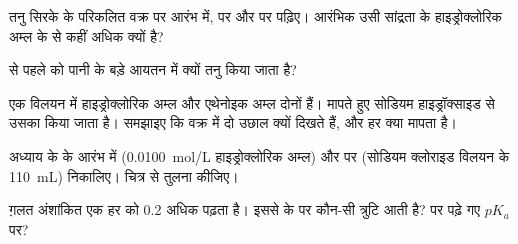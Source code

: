 \begin{exercise}[$\star\star$]\label{exo:g12:ph-conductivity-titrations:10}
तनु सिरके के परिकलित वक्र पर आरंभ में,
 पर और  पर  पढ़िए। आरंभिक  उसी सांद्रता के
हाइड्रोक्लोरिक अम्ल के  से कहीं अधिक क्यों है?
\end{exercise}

\begin{exercise}[$\star\star$]\label{exo:g12:ph-conductivity-titrations:11}
 से पहले  को पानी के बड़े आयतन में
क्यों तनु किया जाता है?
\end{exercise}

\begin{exercise}[$\star\star\star$]\label{exo:g12:ph-conductivity-titrations:12}
एक विलयन में हाइड्रोक्लोरिक अम्ल और एथेनोइक अम्ल दोनों हैं।  मापते हुए
सोडियम हाइड्रॉक्साइड से उसका  किया जाता है। समझाइए कि
वक्र में दो उछाल क्यों दिखते हैं, और हर  क्या मापता है।
\end{exercise}

\begin{exercise}[$\star\star\star$]\label{exo:g12:ph-conductivity-titrations:13}
अध्याय के  के आरंभ में (\qty{0.0100}{mol/L} हाइड्रोक्लोरिक अम्ल)
और  पर (सोडियम क्लोराइड विलयन के \qty{110}{mL}) 
निकालिए। चित्र से तुलना कीजिए।
\end{exercise}

\begin{exercise}[$\star\star\star$]\label{exo:g12:ph-conductivity-titrations:14}
ग़लत अंशांकित एक  हर  को 0.2 अधिक पढ़ता है। इससे  के
 पर कौन-सी त्रुटि आती है?  पर पढ़े गए $pK_a$
पर?
\end{exercise}

